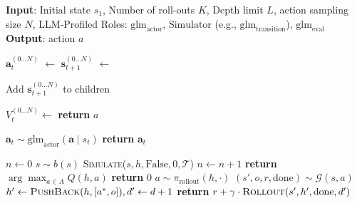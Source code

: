 \begin{algorithm*}
\caption{MCTS for LLM-based Planning. Details are ignored for the following procedures: one at a pass or all at a pass for \textsc{Sample\_Actions} } 
\label{alg:llm_mcts}
\small
\textbf{Input}: Initial state $s_1$, Number of roll-outs $K$, Depth limit $L$, action sampling size $N$, LLM-Profiled Roles: $\text{glm}_\text{actor}$, 
$\text{Simulator}$ (e.g., $\text{glm}_\text{transition}$), $\text{glm}_\text{eval}$ \\
\textbf{Output}: action $a$

\noindent
\begin{minipage}[t]{0.48\textwidth}
    \begin{algorithmic}[1]
                \State $\mathbf{a}_t^{(0\ldots N)}$ $\gets$                   
                \State $\mathbf{s}_{t+1}^{(0\ldots N)}$ $\gets$  

                \State Add $\mathbf{s}_{t+1}^{(0\ldots N)}$ to children
                
                \State $V_t^{(0\ldots N)} \gets$ 
            \EndIf
        \EndFor
        \EndFor
        \State \textbf{return} $a$

        \State $\mathbf{a}_t \sim \text{glm}_\text{actor} \left(\mathbf{a} \mid s_t \right)$
        \State \textbf{return} $\mathbf{a}_t$
        \EndProcedure
    \end{algorithmic}
\end{minipage}%
\hfill
\begin{minipage}[t]{0.48\textwidth}
    \begin{algorithmic}[1]
            \State $n \gets 0$
                \State $s \sim b(s)$
                \State \textsc{Simulate}($s, h, \text{False}, 0, \mathcal{T}$)
                \State $n \gets n + 1$
            \EndWhile
            \State \textbf{return} $\arg \max_{a \in A} Q(h, a)$
        \EndProcedure
                \State \textbf{return} 0
            \EndIf
            \State $a \sim \pi_\text{rollout}(h, \cdot)$
            \State $(s', o, r, \text{done}) \sim \mathcal{G}(s, a)$
            \State $h' \gets \textsc{PushBack}(h, [a^*, o]), d' \gets d + 1$
            \State \textbf{return} $r + \gamma \cdot \textsc{Rollout}(s', h', \text{done}, d')$
        \EndProcedure
    \end{algorithmic}
\end{minipage}
\end{algorithm*}